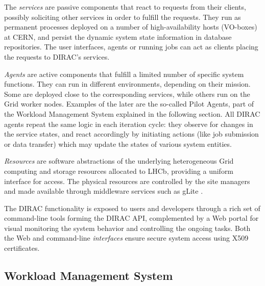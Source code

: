 \documentclass[10pt,conference]{IEEEtran}
\begin{document}
The \textit{services} are passive components that react to requests from their clients,
possibly soliciting other services in order to fulfill the requests. They run as
permanent processes deployed on a number of high-availability hosts (VO-boxes)
at CERN, and persist the dynamic system state information in database
repositories. The user interfaces, agents or running jobs can act as clients
placing the requests to DIRAC’s services.

\textit{Agents} are active components that fulfill a limited number of specific system
functions. They can run in different environments, depending on their mission.
Some are deployed close to the corresponding services, while others run on the
Grid worker nodes.  Examples of the later are the so-called Pilot Agents, part
of the Workload Management System explained in the following section. All DIRAC
agents repeat the same logic in each iteration cycle: they observe for changes
in the service states, and react accordingly by initiating actions (like job
submission or data transfer) which may update the states of various system
entities.

\textit{Resources} are software abstractions of the underlying heterogeneous Grid
computing and storage resources allocated to LHCb, providing a uniform interface
for access. The physical resources are controlled by the site managers and made
available through middleware services such as gLite \cite{gLite}.

The DIRAC functionality is exposed to users and developers through a rich set of
command-line tools forming the DIRAC API, complemented by a Web portal for
visual monitoring the system behavior and controlling the ongoing tasks. Both
the Web and command-line \textit{interfaces} ensure secure system access using X509
certificates.

\subsection{Workload Management System}
\end{document}
